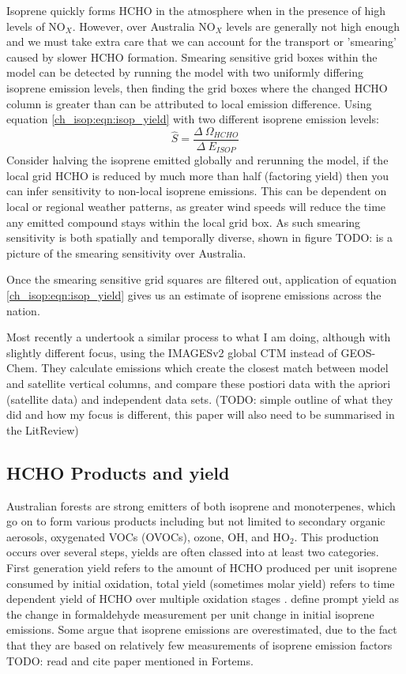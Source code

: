     Isoprene quickly forms HCHO in the atmosphere when in the presence of high levels of NO$_X$.
    However, over Australia NO$_X$ levels are generally not high enough and we must take extra care that we can account for the transport or 'smearing' caused by slower HCHO formation.
    Smearing sensitive grid boxes within the model can be detected by running the model with two uniformly differing isoprene emission levels, then finding the grid boxes where the changed HCHO column is greater than can be attributed to local emission difference.
    Using equation \ref{ch_isop:eqn:isop_yield} with two different isoprene emission levels:
    \begin{equation*}
      \hat{S} = \frac{\Delta~\Omega_{HCHO}}{\Delta~E_{ISOP}}
    \end{equation*}
    Consider halving the isoprene emitted globally and rerunning the model, if the local grid HCHO is reduced by much more than half (factoring yield) then you can infer sensitivity to non-local isoprene emissions.
    This can be dependent on local or regional weather patterns, as greater wind speeds will reduce the time any emitted compound stays within the local grid box.
    As such smearing sensitivity is both spatially and temporally diverse, shown in figure TODO: is a picture of the smearing sensitivity over Australia.
   
    Once the smearing sensitive grid squares are filtered out, application of equation \ref{ch_isop:eqn:isop_yield} gives us an estimate of isoprene emissions across the nation.
    
    Most recently a \citet{Bauwens2016} undertook a similar process to what I am doing, although with slightly different focus, using the IMAGESv2 global CTM instead of GEOS-Chem.
    They calculate emissions which create the closest match between model and satellite vertical columns, and compare these postiori data with the apriori (satellite data) and independent data sets.
    (TODO: simple outline of what they did and how my focus is different, this paper will also need to be summarised in the LitReview)

  \subsection{HCHO Products and yield}
    Australian forests are strong emitters of both isoprene and monoterpenes, which go on to form various products including but not limited to secondary organic aerosols, oxygenated VOCs (OVOCs), ozone, OH, and HO$_2$.
    This production occurs over several steps, yields are often classed into at least two categories.
    First generation yield refers to the amount of HCHO produced per unit isoprene consumed by initial oxidation, total yield (sometimes molar yield) refers to time dependent yield of HCHO over multiple oxidation stages \citep{Wolfe2016}.
    \citet{Wolfe2016} define prompt yield as the change in formaldehyde measurement per unit change in initial isoprene emissions.
    Some argue that isoprene emissions are overestimated, due to the fact that they are based on relatively few measurements of isoprene emission factors \citep{Winters2009, FortemsCheiney2012} TODO: read and cite paper mentioned in Fortems.
    
